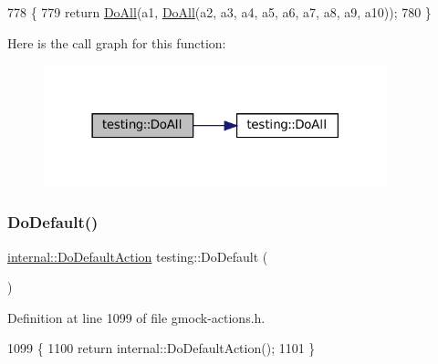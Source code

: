 \begin{DoxyCode}
778                                                       \{
779   \textcolor{keywordflow}{return} \hyperlink{namespacetesting_a79ac222c485c7aa0a1774bee17dadb10}{DoAll}(a1, \hyperlink{namespacetesting_a79ac222c485c7aa0a1774bee17dadb10}{DoAll}(a2, a3, a4, a5, a6, a7, a8, a9, a10));
780 \}
\end{DoxyCode}
Here is the call graph for this function\+:
\nopagebreak
\begin{figure}[H]
\begin{center}
\leavevmode
\includegraphics[width=282pt]{namespacetesting_a79ac222c485c7aa0a1774bee17dadb10_cgraph}
\end{center}
\end{figure}
\mbox{\label{namespacetesting_ae041df61ff61ccb9753ba15b4309e1a6}} 
\subsubsection{\texorpdfstring{Do\+Default()}{DoDefault()}}
{\footnotesize\ttfamily \hyperlink{classtesting_1_1internal_1_1DoDefaultAction}{internal\+::\+Do\+Default\+Action} testing\+::\+Do\+Default (\begin{DoxyParamCaption}{ }\end{DoxyParamCaption})\hspace{0.3cm}{\ttfamily [inline]}}



Definition at line 1099 of file gmock-\/actions.\+h.


\begin{DoxyCode}
1099                                            \{
1100   \textcolor{keywordflow}{return} internal::DoDefaultAction();
1101 \}
\end{DoxyCode}
\mbox{\label{namespacetesting_a1f49f9d97f03bfa4db26888f03486a9f}} 
